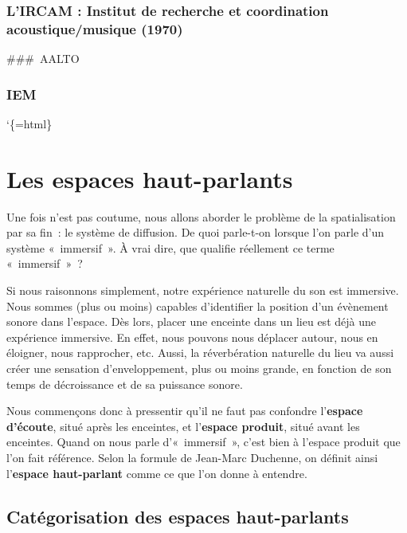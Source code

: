 \documentclass[
  letterpaper,
  DIV=11,
  numbers=noendperiod]{scrreprt}
\begin{document}
\hypertarget{lircam-institut-de-recherche-et-coordination-acoustiquemusique-1970}{%
\subsection{L'IRCAM : Institut de recherche et coordination
acoustique/musique
(1970)}\label{lircam-institut-de-recherche-et-coordination-acoustiquemusique-1970}}

\#\#\#~AALTO

\hypertarget{iem}{%
\subsection{IEM}\label{iem}}

`\{=html\}

\hypertarget{les-espaces-haut-parlants}{%
\chapter{Les espaces haut-parlants}\label{les-espaces-haut-parlants}}

Une fois n'est pas coutume, nous allons aborder le problème de la
spatialisation par sa fin~: le système de diffusion. De quoi parle-t-on
lorsque l'on parle d'un système «~immersif~». À vrai dire, que qualifie
réellement ce terme «~immersif~»~?

Si nous raisonnons simplement, notre expérience naturelle du son est
immersive. Nous sommes (plus ou moins) capables d'identifier la position
d'un évènement sonore dans l'espace. Dès lors, placer une enceinte dans
un lieu est déjà une expérience immersive. En effet, nous pouvons nous
déplacer autour, nous en éloigner, nous rapprocher, etc. Aussi, la
réverbération naturelle du lieu va aussi créer une sensation
d'enveloppement, plus ou moins grande, en fonction de son temps de
décroissance et de sa puissance sonore.

Nous commençons donc à pressentir qu'il ne faut pas confondre
l'\textbf{espace d'écoute}, situé après les enceintes, et
l'\textbf{espace produit}, situé avant les enceintes. Quand on nous
parle d'«~immersif~», c'est bien à l'espace produit que l'on fait
référence. Selon la formule de Jean-Marc Duchenne, on définit ainsi
l'\textbf{espace haut-parlant} comme ce que l'on donne à entendre.

\hypertarget{catuxe9gorisation-des-espaces-haut-parlants}{%
\section{Catégorisation des espaces
haut-parlants}\label{catuxe9gorisation-des-espaces-haut-parlants}}
\end{document}
